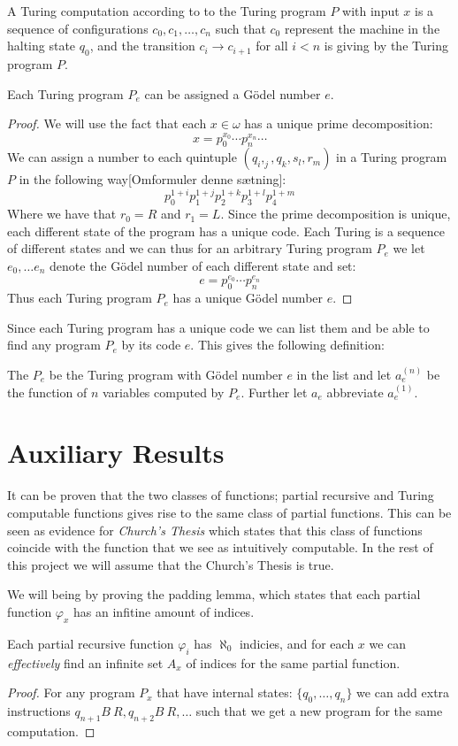 \documentclass[../main.tex]{subfiles}
\begin{document}
\begin{defi}
	A Turing computation according to to the Turing program $P$ with input
	$x$ is a sequence of configurations $c_0,c_1,\ldots, c_n$ such that
	$c_0$ represent the machine in the halting state $q_0$, and the
	transition $c_i\rightarrow c_{i+1}$ for all $i<n$ is giving by the
	Turing program $P$.
\end{defi}

\begin{prop}
	Each Turing program $P_e$ can be assigned a Gödel number $e$.
\end{prop}
\begin{proof}
	We will use the fact that each $x\in\omega$ has a unique
	prime decomposition:
	$$x=p_0^{x_0}\cdots p_n^{x_n}\cdots$$
	We can assign a number to each quintuple $(q_i,_j,q_k,s_l,r_m)$ in a
	Turing program $P$ in the following way[Omformuler denne sætning]:
	$$p_0^{1+i}p_1^{1+j}p_2^{1+k}p_3^{1+l}p_4^{1+m}$$
	Where we have that $r_0=R$ and $r_1=L$. Since the prime decomposition
	is unique, each different state of the program has a unique code. Each Turing
	is a sequence of different states and we can thus for an arbitrary
	Turing program $P_e$ we let $e_0,\ldots e_n$ denote the Gödel number of
	each different state and set:
	$$e=p_0^{e_0}\cdots p_n^{e_n}$$
	Thus each Turing program $P_e$ has a unique Gödel number $e$.
\end{proof}
Since each Turing program has a unique code we can list them and be able to
find any program $P_e$ by its code $e$. This gives the following definition:
\begin{defi}
	The $P_e$ be the Turing program with Gödel number $e$ in the list and
	let $a_e^{(n)}$ be the function of $n$ variables computed by $P_e$.
	Further let $a_e$ abbreviate $a_e^{(1)}$.
\end{defi}
\section{Auxiliary Results}

It can be proven that the two classes of functions; partial recursive and Turing
computable functions gives rise to the same class of partial functions. This
can be seen as evidence for \textit{Church's Thesis} which states that this
class of functions coincide with the function that we see as intuitively
computable. In the rest of this project we will assume that the Church's Thesis
is true.

We will being by proving the padding lemma, which states that each partial
function $\varphi_x$ has an infitine amount of indices.
\begin{lem}
	Each partial recursive function $\varphi_i$ has $\aleph_0$ indicies,
	and for each $x$ we can \textit{effectively} find an infinite set $A_x$
	of indices for the same partial function.
\end{lem}
\begin{proof}
	For any program $P_x$ that have internal states: $\{q_0,\ldots, q_n\}$
	we can add extra instructions $q_{n+1}B\ R ,q_{n+2}B\ R,\ldots$ such
	that we get a new program for the same computation.
\end{proof}
\end{document}
